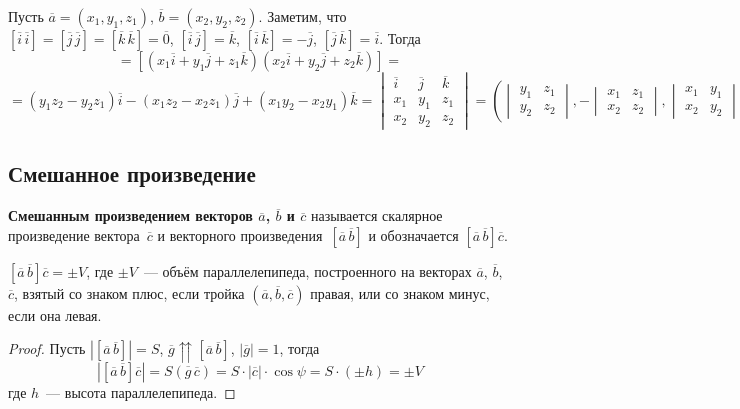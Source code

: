 Пусть $\overline a = (x_1, y_1, z_1)$, $\overline b = (x_2, y_2, z_2)$.
Заметим, что $[\overline i\,\overline i] = [\overline j\,\overline j] = [\overline k\,\overline k] = \overline 0$, $[\overline i\,\overline j] = \overline k$, $[\overline i\,\overline k] = -\overline j$, $[\overline j\,\overline k] = \overline i$.
Тогда
\begin{equation*}
[\overline a\,\overline b] =
[(x_1 \overline i + y_1 \overline j + z_1 \overline k)(x_2 \overline i + y_2 \overline j + z_2 \overline k)] =
\end{equation*}
\begin{equation*}
= (y_1 z_2 - y_2 z_1) \overline i - (x_1 z_2 - x_2 z_1) \overline j + (x_1 y_2 - x_2 y_1) \overline k =
\begin{vmatrix}
\overline i & \overline j & \overline k \\
x_1 & y_1 & z_1 \\
x_2 & y_2 & z_2
\end{vmatrix} =
\left(
\begin{vmatrix}
y_1 & z_1 \\
y_2 & z_2
\end{vmatrix},
-\begin{vmatrix}
x_1 & z_1 \\
x_2 & z_2
\end{vmatrix},
\begin{vmatrix}
x_1 & y_1 \\
x_2 & y_2
\end{vmatrix}
\right)
\end{equation*}

\subsection{Смешанное произведение}
 \textbf{Смешанным произведением векторов $\overline a$, $\overline b$ и $\overline c$} называется скалярное произведение вектора~$\overline c$ и векторного произведения~$[\overline a\,\overline b]$ и обозначается $[\overline a\,\overline b] \overline c$.

\begin{statement}
$[\overline a\,\overline b] \overline c = \pm V$, где $\pm V$~--- объём параллелепипеда, построенного на векторах $\overline a$, $\overline b$, $\overline c$, взятый со знаком плюс, если тройка $(\overline a, \overline b, \overline c)$ правая, или со знаком минус, если она левая.
\end{statement}
\begin{proof}
Пусть $|[\overline a\,\overline b]| = S$, $\overline g \upuparrows [\overline a\,\overline b]$, $|\overline g| = 1$, тогда
\begin{equation*}
|[\overline a\,\overline b] \overline c| =
S(\overline g\,\overline c) =
S \cdot |\overline c| \cdot \cos \psi =
S \cdot (\pm h) = \pm V
\end{equation*}
где $h$~--- высота параллелепипеда.
\end{proof}

